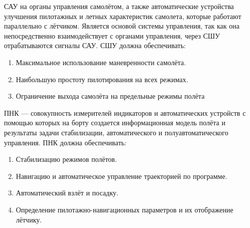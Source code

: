 \documentclass{article}
\begin{document}
САУ на органы управления самолётом, а также автоматические устройства улучшения
пилотажных и летных характеристик самолета, которые работают параллельно с
лётчиком. Является основой системы управления, так как она непосредственно
взаимодействует с органами управления, через СШУ отрабатываются сигналы САУ.
СШУ должна обеспечивать: \begin{enumerate}
    \item Максимальное использование маневренности самолёта.
    \item Наибольшую простоту пилотирования на всех режимах.
    \item Ограничение выхода самолёта на предельные режимы полёта
\end{enumerate}
ПНК --- совокупность измерителей индикаторов и автоматических устройств с
помощью которых на борту создается информационная модель полёта и результаты
задачи стабилизации, автоматического и полуавтоматического управления. ПНК
должна обеспечивать: \begin{enumerate}
    \item Стабилизацию режимов полётов.
    \item Навигацию и автоматическое управление траекторией по программе.
    \item Автоматический взлёт и посадку.
    \item Определение пилотажно-навигационных параметров и их отображение
        лётчику.
\end{enumerate}
\end{document}
